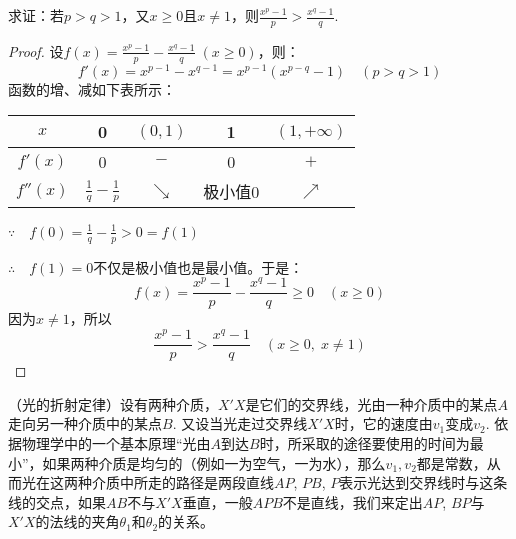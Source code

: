\begin{example}
    求证：若$p>q>1$，又$x\ge 0$且$x\ne 1$，则$\frac{x^p-1}{p}>\frac{x^q-1}{q}$.
\end{example}

\begin{proof}
设$f(x)=\frac{x^p-1}{p}-\frac{x^q-1}{q}\; (x\ge 0)$，则：
\[f'(x)=x^{p-1}-x^{q-1}=x^{p-1}\left(x^{p-q}-1\right)\quad (p>q>1)\]
    函数的增、减如下表所示：
\begin{center}
\begin{tabular}{c|cccc}
\hline
$x$&0&$(0,1)$&1& $(1,+\infty)$\\
\hline
$f'(x)$&0&$-$&0&$+$\\
$f''(x)$&$\frac{1}{q}-\frac{1}{p}$&$\searrow$&极小值0& $\nearrow$\\ 
\hline
    \end{tabular}
\end{center}

$\because\quad f(0)=\frac{1}{q}-\frac{1}{p}>0=f(1)$

$\therefore\quad f(1)=0$不仅是极小值也是最小值。于是：
\[f(x)=\frac{x^p-1}{p}-\frac{x^q-1}{q}\ge 0\quad (x\ge 0)\]
因为$x\ne 1$，所以
\[\frac{x^p-1}{p}>\frac{x^q-1}{q}\quad (x\ge 0,\; x\ne 1)\]
\end{proof}

\begin{example}
 （光的折射定律）设有两种介质，$X'X$是它们的交界线，光由一种介质中的某点$A$走向另一种介质中的某点$B$. 又设当光走过交界线$X'X$时，它的速度由$v_1$变成$v_2$. 依据物理学中的一个基本原理“光由$A$到达$B$时，所采取的途径要使用的时间为最小”，如果两种介质是均匀的（例如一为空气，一为水），那么$v_1,v_2$都是常数，从而光在这两种介质中所走的路径是两段直线$AP$, $PB$, $P$表示光达到交界线时与这条线的交点，如果$AB$不与$X'X$垂直，一般$APB$不是直线，我们来定出$AP$, $BP$与$X'X$的法线的夹角$\theta_1$和$\theta_2$的关系。
\end{example}

    \begin{figure}[htp]
    \centering
{}
    \caption{}
\end{figure}

